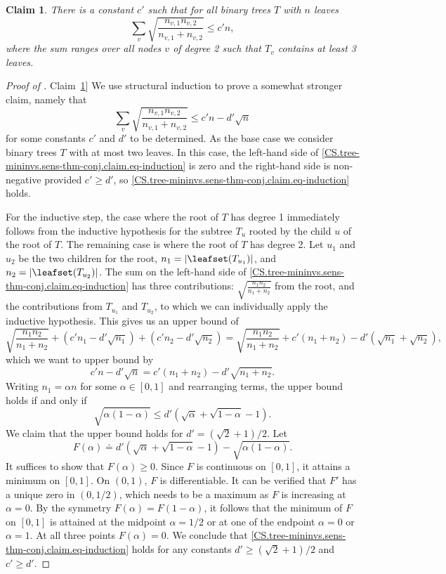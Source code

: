 \documentclass[11pt]{article}
\numberwithin{equation}{section}
\newtheorem{claim}[theorem]{Claim}
\theoremstyle{definition}
\theoremstyle{plain}
\newcommand{\expref}[2]{\hyperref[#2]{#1~\ref{#2}}}
\begin{document}
\begin{claim}
    \label{claim:sensitivity:sum}
    There is a constant $c'$ such that for all binary trees $T$ with $n$ leaves 
    \begin{equation}
      \sum_v \sqrt{\frac{n_{v,1}n_{v,2}}{n_{v,1}+n_{v,2}}} \le c'n,
    \end{equation}
    where the sum ranges over all nodes $v$ of degree 2 such that $T_v$ contains at least 3 leaves.
  \end{claim}
\begin{proof}[Proof of \expref{Claim}{claim:sensitivity:sum}]
We use structural induction to prove a somewhat stronger claim, namely that
\begin{equation}\label{CS.tree-mininvs.sens-thm-conj.claim.eq-induction}
  \sum_v \sqrt{\frac{n_{v,1}n_{v,2}}{n_{v,1}+n_{v,2}}} \le c' n - d' \sqrt{n}
\end{equation}
for some constants $c'$ and $d'$ to be determined.
As the base case we consider binary trees $T$ with at most two leaves. In this case, the left-hand side of \eqref{CS.tree-mininvs.sens-thm-conj.claim.eq-induction} is zero and the right-hand side is non-negative provided $c' \ge d'$, so \eqref{CS.tree-mininvs.sens-thm-conj.claim.eq-induction} holds. 

For the inductive step, the case where the root of $T$ has degree 1 immediately follows from the inductive hypothesis for the subtree $T_u$ rooted by the child $u$ of the root of $T$. The remaining case is where the root of $T$ has degree 2. Let $u_1$ and $u_2$ be the two children for the root, $n_1 = \lvert\leafset(T_{u_1})\rvert$, and 
$n_2 = \lvert\leafset(T_{u_2})\rvert$. The sum on the left-hand side of \eqref{CS.tree-mininvs.sens-thm-conj.claim.eq-induction} has three contributions: $\sqrt{\frac{n_1 n_2}{n_1+n_2}}$ from the root, and the contributions from $T_{u_1}$ and $T_{u_2}$, to which we can individually apply the inductive hypothesis. This gives us an upper bound of
\[ \sqrt{\frac{n_1 n_2}{n_1+n_2}} + (c' n_1 - d' \sqrt{n_1}) + (c' n_2 - d' \sqrt{n_2})
=  \sqrt{\frac{n_1 n_2}{n_1+n_2}} + c' (n_1 + n_2) - d' (\sqrt{n_1} + \sqrt{n_2}), \]
which we want to upper bound by
\[ c' n - d' \sqrt{n} = c' (n_1 + n_2) - d' \sqrt{n_1+n_2}. \]
Writing $n_1 = \alpha n$ for some $\alpha \in [0,1]$ and rearranging terms, the upper bound holds if and only if
\[ \sqrt{\alpha(1-\alpha)} \le d' (\sqrt{\alpha} + \sqrt{1-\alpha} -1). \]
We claim that the upper bound holds for $d'= (\sqrt{2}+1)/2$. Let 
\[F(\alpha) \doteq d'(\sqrt{\alpha}+\sqrt{1-\alpha}-1)-\sqrt{\alpha(1-\alpha)}.\]
It suffices to show that $F(\alpha)\ge 0$. Since $F$ is continuous on $[0,1]$, it attains a minimum on $[0,1]$. On $(0,1)$, $F$ is differentiable. It can be verified that $F'$ has a unique zero in $(0,1/2)$, which needs to be a maximum as $F$ is increasing at $\alpha=0$. By the symmetry $F(\alpha)=F(1-\alpha)$, it follows that the minimum of $F$ on $[0,1]$ is attained at the midpoint $\alpha=1/2$ or at one of the endpoint $\alpha=0$ or $\alpha=1$. At all three points $F(\alpha)=0$. 
We conclude that \eqref{CS.tree-mininvs.sens-thm-conj.claim.eq-induction} holds for any constants $d' \ge (\sqrt{2}+1)/2$ and $c' \ge d'$.
\end{proof}
\end{document}
